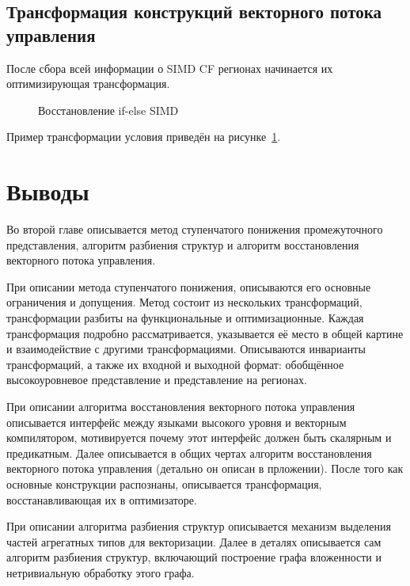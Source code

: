 \subsection{Трансформация конструкций векторного потока управления}\label{sec:lowering/simdcf/transform}

После сбора всей информации о SIMD CF регионах начинается их оптимизирующая трансформация.

\begin{figure}[ht]
    \caption{Восстановление if-else SIMD}\label{fig:if-else-BE}
\end{figure}

Пример трансформации условия приведён на рисунке~\ref{fig:if-else-BE}.

\section{Выводы}\label{sec:lowering/outcome}

Во второй главе описывается метод ступенчатого понижения промежуточного представления, алгоритм разбиения структур и алгоритм восстановления векторного потока управления.

При описании метода ступенчатого понижения, описываются его основные ограничения и допущения. Метод состоит из нескольких трансформаций, трансформации разбиты на функциональные и оптимизационные. Каждая трансформация подробно рассматривается, указывается её место в общей картине и взаимодействие с другими трансформациями. Описываются инварианты трансформаций, а также их входной и выходной формат: обобщённое высокоуровневое представление и представление на регионах.

При описании алгоритма восстановления векторного потока управления описывается интерфейс между языками высокого уровня и векторным компилятором, мотивируется почему этот интерфейс должен быть скалярным и предикатным. Далее описывается в общих чертах алгоритм восстановления векторного потока управления (детально он описан в прложении). После того как основные конструкции распознаны, описывается трансформация, восстанавливающая их в оптимизаторе.

При описании алгоритма разбиения структур описывается механизм выделения частей агрегатных типов для векторизации. Далее в деталях описывается сам алгоритм разбиения структур, включающий построение графа вложенности и нетривиальную обработку этого графа.

\FloatBarrier